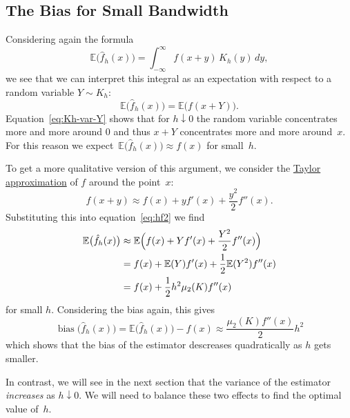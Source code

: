 \documentclass[
  a4paper,
]{article}
\theoremstyle{definition}
\theoremstyle{definition}
\theoremstyle{definition}
\theoremstyle{definition}
\theoremstyle{remark}
\begin{document}
\hypertarget{the-bias-for-small-bandwidth}{%
\subsection{The Bias for Small Bandwidth}\label{the-bias-for-small-bandwidth}}

Considering again the formula
\begin{equation*}
    \mathbb{E}\bigl(\hat f_h(x)\bigr)
    = \int_{-\infty}^\infty f(x+y) \, K_h(y) \, dy,
\end{equation*}
we see that we can interpret this integral as an expectation
with respect to a random variable \(Y \sim K_h\):
\begin{equation}
    \mathbb{E}\bigl(\hat f_h(x)\bigr)
    = \mathbb{E}\bigl( f(x+Y) \bigr).  \label{eq:hf2}
\end{equation}
Equation~\eqref{eq:Kh-var-Y} shows that for \(h \downarrow 0\) the random
variable concentrates more and more around \(0\) and thus \(x+Y\) concentrates
more and more around~\(x\). For this reason we
expect~\(\mathbb{E}\bigl(\hat f_h(x)\bigr) \approx f(x)\) for small~\(h\).

To get a more qualitative version of this argument, we consider the
\href{https://en.wikipedia.org/wiki/Taylor\%27s_theorem}{Taylor approximation}
of \(f\) around the point~\(x\):
\begin{equation*}
  f(x + y)
  \approx f(x) + y f'(x) + \frac{y^2}{2} f''(x).
\end{equation*}
Substituting this into equation~\eqref{eq:hf2} we find
\begin{align*}
    \mathbb{E}\bigl(\hat f_h(x)\bigr)
    &\approx \mathbb{E}\Bigl( f(x) + Y f'(x) + \frac{Y^2}{2} f''(x) \Bigr) \\
    &= f(x) + \mathbb{E}(Y) f'(x) + \frac12 \mathbb{E}(Y^2) f''(x) \\
    &= f(x) + \frac12 h^2 \mu_2(K) f''(x)
\end{align*}
for small \(h\). Considering the bias again, this gives
\begin{equation}
  \mathop{\mathrm{bias}}\bigl( \hat f_h(x) \bigr)
  = \mathbb{E}\bigl( \hat f_h(x) \bigr) - f(x)
  \approx \frac{\mu_2(K) f''(x)}{2} h^2  \label{eq:fhatbias}
\end{equation}
which shows that the bias of the estimator descreases quadratically
as \(h\) gets smaller.

In contrast, we will see in the next section that the variance of the
estimator \emph{increases} as \(h \downarrow 0\). We will need to balance these
two effects to find the optimal value of~\(h\).
\end{document}
